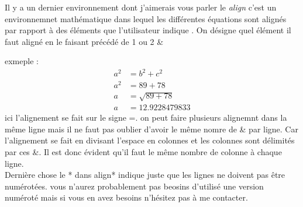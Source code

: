 \documentclass[fontsize=10pt]{article}
\begin{document}
\begin{itemize}
Il y a un dernier environnement dont j'aimerais vous parler le \emph{align} c'est un environnemnet mathématique dans lequel les différentes équations sont alignés par rapport à des éléments que l'utilisateur indique . On désigne quel élément il faut aligné en le faisant précédé de 1 ou 2 \& 

exmeple : 
\begin{align*}
a^2 &= b^2+c^2\\
a^2 &= 89 + 78\\
a &= \sqrt{89+78}\\
a &= 12.9228479833
\end{align*}
ici l'alignement se fait sur le signe =. on peut faire plusieurs alignemnt dans la même ligne mais il ne faut pas oublier d'avoir le même nomre de \& par ligne. Car l'alignement se fait en divisant l'espace en colonnes et les colonnes sont délimités par ces \&. Il est donc évident qu'il faut le même nombre de colonne à chaque ligne.\\
Dernière chose le * dans align* indique juste que les lignes ne doivent pas être numérotées. vous n'aurez probablement pas beosins d'utilisé une version numéroté mais si vous en avez besoins n'hésitez pas à me contacter.


\end{itemize}
\end{document}
